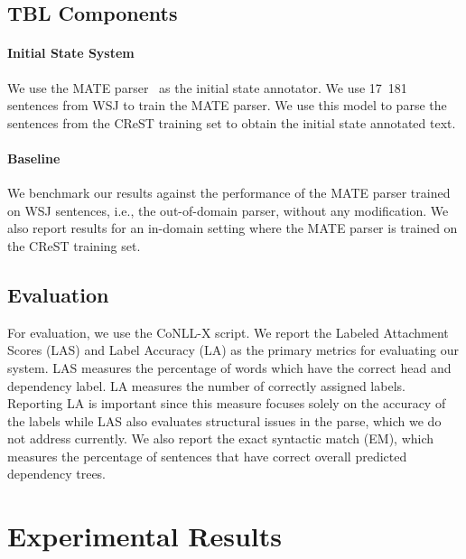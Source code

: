 
\subsection{TBL Components}

\paragraph{Initial State System}
We use the MATE parser~\cite{bohnet:2010:PAPERS} as the initial state annotator. We use 17~181 sentences from WSJ to train the MATE parser. We use this model to parse the sentences from the CReST training set to obtain the initial state annotated text.

\paragraph{Baseline}

We benchmark our results against the performance of the MATE parser trained on WSJ sentences, i.e., the out-of-domain parser, without any modification. We also report results for an in-domain setting where the MATE parser is trained on the CReST training set.


\subsection{Evaluation}
For evaluation, we use the CoNLL-X script. We report the Labeled Attachment Scores  (LAS) and Label Accuracy  (LA) as the primary metrics for evaluating our system. LAS measures the percentage of words which have the correct head and dependency label. LA measures the number of correctly assigned labels. Reporting LA is important  since this measure focuses solely on the accuracy of the labels while LAS also evaluates structural issues in the parse, which we do not address currently. We
also report the exact syntactic match (EM), which measures the percentage of sentences that have correct overall predicted dependency trees.

\section{Experimental Results} \label{expt_results}

